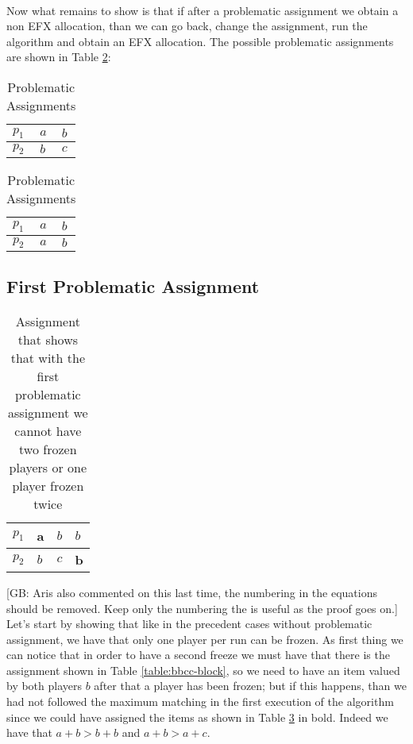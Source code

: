 \documentclass{article}
\newcommand{\gb}[1]{{\color{red}[GB: #1]}}
\begin{document}
\paragraph{}
Now what remains to show is that if after a problematic assignment we obtain a non EFX allocation, than we can go back, change the assignment, run the algorithm and obtain an EFX allocation. 
The possible problematic assignments are shown in Table \ref{table:problematic-assignments-2-players}:
\begin{table}[h]
    \footnotesize
 
        \centering
       \begin{tabular}{|l|l|l|}
            \hline
            $p_1$ & $a$ & $b$ \\ \hline
            $p_2$ & $b$ & $c$ \\ \hline
        \end{tabular}
        \;\;\;\;\;\;\;\;\;\;\;\;
        \centering
        \begin{tabular}{|l|l|l|}
            \hline
            $p_1$ & $a$ & $b$ \\ \hline
            $p_2$ & $a$ & $b$ \\ \hline
        \end{tabular}
        
        \caption{Problematic Assignments}
        \label{table:problematic-assignments-2-players}
    \end{table}
    
\subsection{First Problematic Assignment}
\begin{table}[]
    \centering
    \begin{tabular}{|l|l|l||l|}
    \hline
    $p_1$ & \textbf{a} & $b$ & $b$        \\ \hline
    $p_2$ & $b$        & $c$ & \textbf{b} \\ \hline
    \end{tabular}
    \label{table:first-problem-association-show-no-double-freeze-first}
    \caption{Assignment that shows that with the first problematic assignment we cannot have two frozen players or one player frozen twice}
\end{table}

\gb{Aris also commented on this last time, the numbering  in the equations should be removed. Keep only the numbering the is useful as the proof goes on.}
Let's start by showing that like in the precedent cases without problematic assignment, we have that only one player per run can be frozen. As first thing we can notice that in order to have a second freeze we must have that there is the assignment shown in Table \ref{table:bbcc-block}, so we need to have an item valued by both players $b$ after that a player has been frozen; but if this happens, than we had not followed the maximum matching in the first execution of the algorithm since we could have assigned the items as shown in Table \ref{table:first-problem-association-show-no-double-freeze-first} in bold. Indeed we have that $a+b > b + b$ and $a+b > a+c$.
\end{document}
